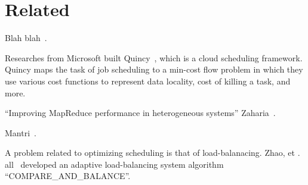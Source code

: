 \section{Related}



Blah blah~\cite{Eucalyptus}.

Researches from Microsoft built Quincy~\cite{Quincy}, which is a cloud
scheduling framework.  Quincy maps the task of job scheduling to a min-cost flow
problem in which they use various cost functions to represent data locality,
cost of killing a task, and more.

``Improving MapReduce performance in heterogeneous systems'' Zaharia~\cite{Zaharia}.

Mantri~\cite{Mantri}.

A problem related to optimizing scheduling is that of load-balanacing.  Zhao, et
. all~\cite{Zhao} developed an adaptive load-balancing system algorithm
``COMPARE\_AND\_BALANCE''.
